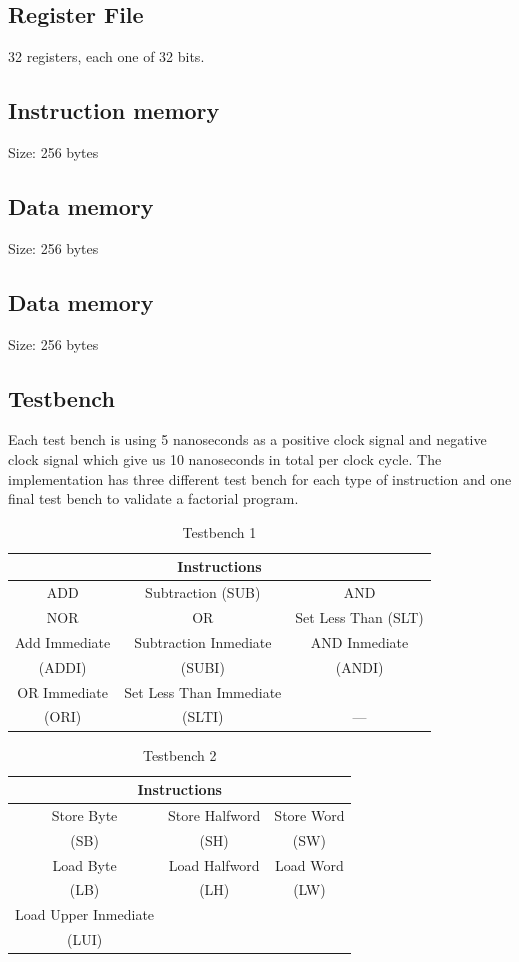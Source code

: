\documentclass[conference]{IEEEtran}
\begin{document}
\subsection{Register File}
32 registers, each one of 32 bits.
\subsection{Instruction memory}
Size: 256 bytes
\subsection{Data memory}
Size: 256 bytes\\
\subsection{Data memory}
Size: 256 bytes\\
\subsection{Testbench}
Each test bench is using 5 nanoseconds as a positive clock signal and negative clock signal which give us 10 nanoseconds in total per clock cycle. The implementation has three different test bench for each type of instruction and one final test bench to validate a factorial program.
\begin{table}[htbp]
\caption{Testbench 1} %
\begin{tabular}{|c|c|c|}
\hline
\multicolumn{3}{|c|}{\textbf{Instructions}} \\
\hline
ADD&Subtraction (SUB)&AND  \\
\hline
NOR&OR&Set Less Than (SLT) \\
\hline
Add Immediate&Subtraction Inmediate & AND Inmediate \\
(ADDI) &(SUBI) & (ANDI) \\
\hline
OR Immediate&Set Less Than Immediate&  \\
(ORI)&(SLTI)& --- \\
\hline
\end{tabular}
\label{tab_test1}
\end{table}

\begin{table}[t]
\caption{Testbench 2} %
\begin{center}
\begin{tabular}{|c|c|c|}
\hline
\multicolumn{3}{|c|}{\textbf{Instructions}} \\
\hline
Store Byte&Store Halfword&Store Word\\
(SB)&(SH)&(SW)  \\
\hline
Load Byte&Load Halfword&Load Word\\
(LB)&(LH)&(LW) \\
\hline
Load Upper Inmediate&&\\
(LUI)&& \\
\hline
\end{tabular}
\label{tab_test2}
\end{center}
\end{table}
\end{document}
